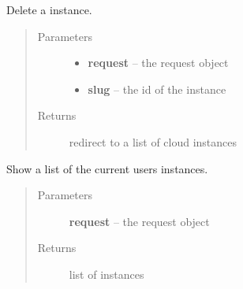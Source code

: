 \documentclass[letterpaper,10pt,english]{sphinxmanual}
\begin{document}

\begin{fulllineitems}
\label{api/cloud:limeade.cloud.views.instance.instance_delete}
Delete a instance.
\begin{quote}\begin{description}
\item[{Parameters}] \leavevmode\begin{itemize}
\item {} 
\textbf{request} -- the request object

\item {} 
\textbf{slug} -- the id of the instance

\end{itemize}

\item[{Returns}] \leavevmode
redirect to a list of cloud instances

\end{description}\end{quote}

\end{fulllineitems}


\begin{fulllineitems}
\label{api/cloud:limeade.cloud.views.instance.instance_list}
Show a list of the current users instances.
\begin{quote}\begin{description}
\item[{Parameters}] \leavevmode
\textbf{request} -- the request object

\item[{Returns}] \leavevmode
list of instances

\end{description}\end{quote}

\end{fulllineitems}

\end{document}
